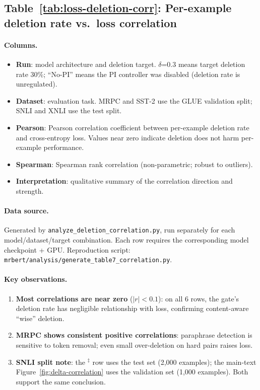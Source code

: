 \documentclass{article} %
\begin{document}
\subsection{Table~\ref{tab:loss-deletion-corr}: Per-example deletion rate vs.\ loss correlation}

\paragraph{Columns.}
\begin{itemize}[nosep]
    \item \textbf{Run}: model architecture and deletion target. $\delta$=0.3 means target deletion rate 30\%; ``No-PI'' means the PI controller was disabled (deletion rate is unregulated).
    \item \textbf{Dataset}: evaluation task. MRPC and SST-2 use the GLUE validation split; SNLI and XNLI use the test split.
    \item \textbf{Pearson}: Pearson correlation coefficient between per-example deletion rate and cross-entropy loss. Values near zero indicate deletion does not harm per-example performance.
    \item \textbf{Spearman}: Spearman rank correlation (non-parametric; robust to outliers).
    \item \textbf{Interpretation}: qualitative summary of the correlation direction and strength.
\end{itemize}

\paragraph{Data source.}
Generated by \texttt{analyze\_deletion\_correlation.py}, run separately for each model/dataset/target combination. Each row requires the corresponding model checkpoint + GPU. Reproduction script: \texttt{mrbert/analysis/generate\_table7\_correlation.py}.

\paragraph{Key observations.}
\begin{enumerate}[nosep]
    \item \textbf{Most correlations are near zero} ($|r|<0.1$): on all 6 rows, the gate's deletion rate has negligible relationship with loss, confirming content-aware ``wise'' deletion.
    \item \textbf{MRPC shows consistent positive correlations}: paraphrase detection is sensitive to token removal; even small over-deletion on hard pairs raises loss.
    \item \textbf{SNLI split note}: the $^\ddagger$ row uses the test set (2,000 examples); the main-text Figure~\ref{fig:delta-correlation} uses the validation set (1,000 examples). Both support the same conclusion.
\end{enumerate}
\end{document}

